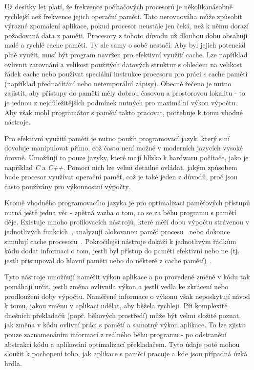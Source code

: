 
Už desítky let platí, že frekvence počítačových procesorů je několikanásobně rychlejší než frekvence jejich operační paměti. Tato nerovnováha může způsobit výrazné zpomalení aplikace, pokud procesor neustále jen čeká, než k němu dorazí požadovaná data z paměti. Procesory z tohoto důvodu už dlouhou dobu obsahují malé a rychlé cache paměti. Ty ale samy o sobě nestačí. Aby byl jejich potenciál plně využit, musí být program navržen pro efektivní využití cache. Lze například ovlivnit zarovnání a velikost použitých datových struktur s ohledem na velikost řádek cache nebo používat speciální instrukce procesoru pro práci s cache pamětí (například přednačítání nebo netemporální zápisy). Obecně řečeno je nutno zajistit, aby přístupy do paměti měly dobrou časovou a prostorovou lokalitu - to je jednou z nejdůležitějších podmínek nutných pro maximální výkon výpočtu. Aby však mohl programátor s pamětí takto pracovat, potřebuje k tomu vhodné nástroje.

Pro efektivní využití paměti je nutno použít programovací jazyk, který s ní dovoluje manipulovat přímo, což často není možné v moderních jazycích vysoké úrovně. Umožňují to pouze jazyky, které mají blízko k hardwaru počítače, jako je například \emph{C} a \emph{C++}. Pomocí nich lze velmi detailně ovládat, jakým způsobem bude procesor využívat operační paměť, což je také jeden z důvodů, proč jsou často používány pro výkonnostní výpočty.

Kromě vhodného programovacího jazyka je pro optimalizaci paměťových přístupů nutná ještě jedna věc - zpětná vazba o tom, co se za běhu programu s pamětí děje. Existuje mnoho profilovacích nástrojů, které měří dobu výpočtu strávenou v jednotlivých funkcích~\cite{gprof}, analyzují alokovanou paměť procesu~\cite{massif} nebo dokonce simulují cache procesoru~\cite{nethercotephd}. Pokročilejší nástroje dokáží k jednotlivým řádkům kódu dodat informaci o tom, jestli byl přístup do paměti efektivní nebo ne (tj. jestli přistupoval do hlavní paměti nebo do některé z cache pamětí)~\cite{vtune}.

Tyto nástroje umožňují naměřit výkon aplikace a po provedené změně v kódu tak pomáhají určit, jestli změna ovlivnila výkon a jestli vedla ke zkrácení nebo prodloužení doby výpočtu. Naměřené informace o výkonu však neposkytují návod k tomu, jakou změnu v aplikaci udělat, aby běžela rychleji. Při komplexitě dnešních překladačů (popř. běhových prostředí) může být velmi složité poznat, jak změna v kódu ovlivní práci s pamětí a samotný výkon aplikace. To lze zjistit pouze zaznamenáním informací z reálného běhu programu - po odstranění abstrakcí kódu a aplikování optimalizací překladačem. Tyto údaje poté mohou sloužit k pochopení toho, jak aplikace s pamětí pracuje a kde jsou případná úzká hrdla.

